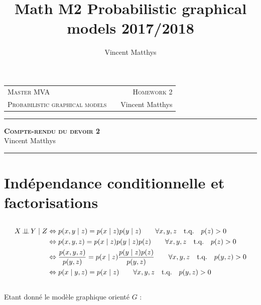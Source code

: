 \documentclass[12pt,a4paper,onecolumn]{article}
\title{Math M2 Probabilistic graphical models 2017/2018}
\author{Vincent Matthys}
\begin{document}
\begin{tabularx}{0.8\textwidth}{@{} l X r @{} }
	{\textsc{Master MVA}}                   &  & \textsc{Homework 2} \\
	\textsc{Probabilistic graphical models} &  & {Vincent Matthys}   \\
\end{tabularx}
\vspace{1.5cm}
\begin{center}
	\rule[11pt]{5cm}{0.5pt}

	\textbf{\LARGE \textsc{Compte-rendu du devoir 2}}
	\vspace{0.5cm}\\
	Vincent Matthys\\
	\rule{5cm}{0.5pt}
	\vspace{1.5cm}
\end{center}

\section{Indépendance conditionnelle et factorisations}

\subsection{}

\begin{equation}
	\begin{split}
		X \,\bot\!\!\!\bot\, Y \mid Z &\Leftrightarrow p(x, y \mid z) = p(x \mid z) p(y \mid z) \qquad \forall x, y, z \quad  \text{t.q.} \quad p(z) > 0 \\
		&\Leftrightarrow p(x, y, z) = p(x \mid z) p(y \mid z) p(z)\qquad \forall x, y, z \quad  \text{t.q.} \quad p(z) > 0 \\
		&\Leftrightarrow \frac{p(x, y ,z)}{p(y , z)} = p(x \mid z) \frac{p(y \mid z) p(z)}{p(y, z)} \qquad \forall x, y, z \quad  \text{t.q.} \quad p(y, z) > 0 \\
		&\Leftrightarrow p(x \mid y, z) = p(x \mid z) \qquad \forall x, y, z \quad  \text{t.q.} \quad p(y, z) > 0 \\
	\end{split}
\end{equation}

\subsection{}

Etant donné le modèle graphique orienté \(G\) :
\end{document}
